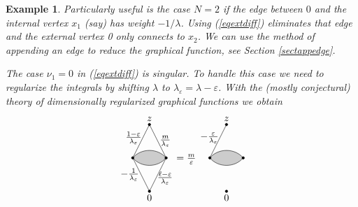 \documentclass[oneside]{amsart}
\theoremstyle{plain}
\newtheorem{ex}[thm]{Example}
\begin{document}
\begin{ex}
Particularly useful is the case $N=2$ if the edge between $0$ and the internal vertex $x_1$ (say) has weight $-1/\lambda$.
Using (\ref{eqextdiff}) eliminates that edge and the external vertex 0 only connects to $x_2$.
We can use the method of appending an edge to reduce the graphical function, see Section \ref{sectappedge}.

The case $\nu_1=0$ in (\ref{eqextdiff}) is singular.
To handle this case we need to regularize the integrals by shifting $\lambda$ to $\lambda_\varepsilon=\lambda-\varepsilon$.
With the (mostly conjectural) theory of dimensionally regularized graphical functions \cite{numfunct,7loops} we obtain
\begin{gather}
\begin{gathered}
\begin{tikzpicture}[baseline={([yshift=-.7ex]0,0)}]
    \pgfmathsetmacro{\rad}{1.2}
    \coordinate[label=above:$z$] (vz) at (0,\rad);
    \coordinate (v1) at ({-\rad/2},0);
    \coordinate (v2) at ({\rad/2},0);
    \coordinate[label=below:$0$] (v0) at (0,-\rad);
    \coordinate (vp) at ({-\rad/4},{\rad/2});
%
    \draw[fill=black!20] (v1) to[bend left=50] (v2) to[bend left=50] (v1);
%
    \filldraw (vz) circle (1.3pt);
    \filldraw (v1) circle (1.3pt);
    \filldraw (v2) circle (1.3pt);
    \filldraw (v0) circle (1.3pt);
%
    \draw (vz) -- node[inner sep=1pt,pos=.4,left] {\tiny{$\frac{1-\varepsilon}{\lambda_\varepsilon}$}}(v1);
    \draw (vz) -- node[inner sep=2pt,right] {\tiny{$\frac{m}{\lambda_\varepsilon}$}}(v2);
    \draw (v0) -- node[inner sep=1pt,pos=.4,right] {\tiny{$\frac{\ell-\varepsilon}{\lambda_\varepsilon}$}}(v2);
    \draw (v0) -- node[inner sep=2pt,left] {\tiny{$-\frac{1}{\lambda_\varepsilon}$}}(v1);
\end{tikzpicture}
=
\tfrac{m}{\varepsilon}
~
\begin{tikzpicture}[baseline={([yshift=-.7ex]0,0)}]
    \pgfmathsetmacro{\rad}{1.2}
    \coordinate[label=above:$z$] (vz) at (0,\rad);
    \coordinate (v1) at ({-\rad/2},0);
    \coordinate (v2) at ({\rad/2},0);
    \coordinate[label=below:$0$] (v0) at (0,-\rad);
%
    \draw[fill=black!20] (v1) to[bend left=50] (v2) to[bend left=50] (v1);
%
    \filldraw (vz) circle (1.3pt);
    \filldraw (v1) circle (1.3pt);
    \filldraw (v2) circle (1.3pt);
    \filldraw (v0) circle (1.3pt);
%
    \draw (vz) -- node[inner sep=1pt,pos=.4,left] {\tiny{$-\frac{\varepsilon}{\lambda_\varepsilon}$}}(v1);

\end{tikzpicture}
\end{gathered}
\end{gather}
\end{ex}
\end{document}
